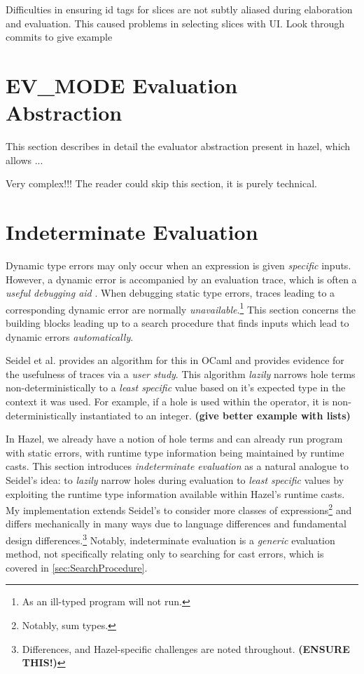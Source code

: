 Difficulties in ensuring id tags for slices are not subtly aliased during elaboration and evaluation. This caused problems in selecting slices with UI. Look through commits to give example

\section{EV\_MODE Evaluation Abstraction}
\label{sec:EVMode}
This section describes in detail the evaluator abstraction present in hazel, which allows ...

Very complex!!! The reader could skip this section, it is purely technical.

\section{Indeterminate Evaluation}\label{sec:IndetEval}
Dynamic type errors may only occur when an expression is given \textit{specific} inputs. However, a dynamic error is accompanied by an evaluation trace, which is often a \textit{useful debugging aid} \cite{TraceVisualisation}. When debugging static type errors, traces leading to a corresponding dynamic error are normally \textit{unavailable}.\footnote{As an ill-typed program will not run.} This section concerns the building blocks leading up to a search procedure that finds inputs which lead to dynamic errors \textit{automatically}.

Seidel et al. \cite{SearchProc} provides an algorithm for this in OCaml and provides evidence for the usefulness of traces via a \textit{user study}. This algorithm \textit{lazily} narrows hole terms non-deterministically to a \textit{least specific} value based on it's expected type in the context it was used. For example, if a hole is used within the \code{(+)} operator, it is non-deterministically instantiated to an integer. \textbf{(give better example with lists)}

In Hazel, we already have a notion of hole terms and can already run program with static errors, with runtime type information being maintained by runtime casts. This section introduces \textit{indeterminate evaluation} as a natural analogue to Seidel's idea: to \textit{lazily} narrow holes during evaluation to \textit{least specific} values by exploiting the runtime type information available within Hazel's runtime casts. My implementation extends Seidel's to consider more classes of expressions\footnote{Notably, sum types.} and differs mechanically in many ways due to language differences and fundamental design differences.\footnote{Differences, and Hazel-specific challenges are noted throughout. \textbf{(ENSURE THIS!)}} Notably, indeterminate evaluation is a \textit{generic} evaluation method, not specifically relating only to searching for cast errors, which is covered in \cref{sec:SearchProcedure}.

